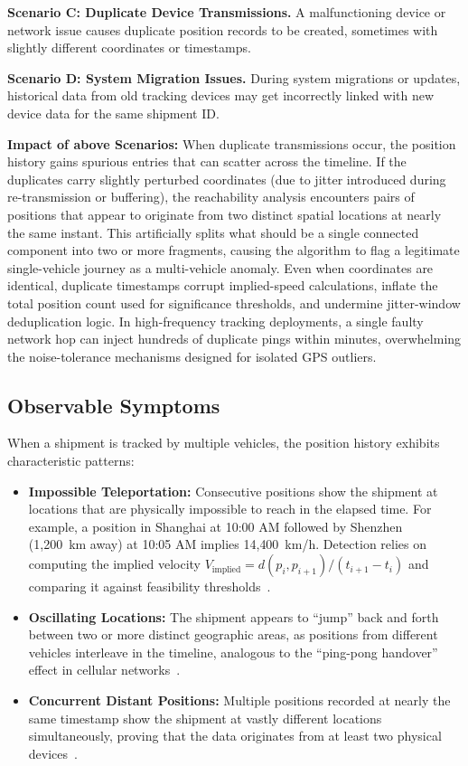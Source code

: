 \textbf{Scenario C: Duplicate Device Transmissions.} A malfunctioning device or network issue causes duplicate position records to be created, sometimes with slightly different coordinates or timestamps.

\textbf{Scenario D: System Migration Issues.} During system migrations or updates, historical data from old tracking devices may get incorrectly linked with new device data for the same shipment ID.

\textbf{Impact of above Scenarios:} When duplicate transmissions occur, the position history gains spurious entries that can scatter across the timeline. If the duplicates carry slightly perturbed coordinates (due to jitter introduced during re-transmission or buffering), the reachability analysis encounters pairs of positions that appear to originate from two distinct spatial locations at nearly the same instant. This artificially splits what should be a single connected component into two or more fragments, causing the algorithm to flag a legitimate single-vehicle journey as a multi-vehicle anomaly. Even when coordinates are identical, duplicate timestamps corrupt implied-speed calculations, inflate the total position count used for significance thresholds, and undermine jitter-window deduplication logic. In high-frequency tracking deployments, a single faulty network hop can inject hundreds of duplicate pings within minutes, overwhelming the noise-tolerance mechanisms designed for isolated GPS outliers.

\subsection{Observable Symptoms}
When a shipment is tracked by multiple vehicles, the position history exhibits characteristic patterns:

\begin{itemize}
    \item \textbf{Impossible Teleportation:} Consecutive positions show the shipment at locations that are physically impossible to reach in the elapsed time. For example, a position in Shanghai at 10:00 AM followed by Shenzhen (1,200~km away) at 10:05 AM implies 14{,}400~km/h. Detection relies on computing the implied velocity $V_{\text{implied}} = d(p_i, p_{i+1}) / (t_{i+1} - t_i)$ and comparing it against feasibility thresholds~\cite{yuan2020toddt, chen2024unitraj, li2009temporal}.
    \item \textbf{Oscillating Locations:} The shipment appears to ``jump'' back and forth between two or more distinct geographic areas, as positions from different vehicles interleave in the timeline, analogous to the ``ping-pong handover'' effect in cellular networks~\cite{zahedi2017pingpong, garcia2025trucks}.
    \item \textbf{Concurrent Distant Positions:} Multiple positions recorded at nearly the same timestamp show the shipment at vastly different locations simultaneously, proving that the data originates from at least two physical devices~\cite{wang2024courier, dai2022realte}.
\end{itemize}

